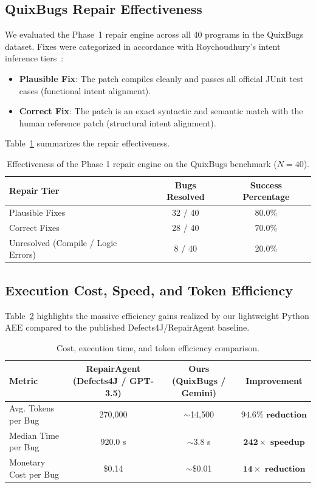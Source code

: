 \documentclass[12pt,a4paper]{report}
\begin{document}
\subsection{QuixBugs Repair Effectiveness}
We evaluated the Phase~1 repair engine across all 40 programs in the QuixBugs dataset. Fixes were categorized in accordance with Roychoudhury's intent inference tiers~\cite{roychoudhury2025agentic}:
\begin{itemize}
    \item \textbf{Plausible Fix}: The patch compiles cleanly and passes all official JUnit test cases (functional intent alignment).
    \item \textbf{Correct Fix}: The patch is an exact syntactic and semantic match with the human reference patch (structural intent alignment).
\end{itemize}

Table~\ref{tab:quixbugs_results} summarizes the repair effectiveness.

\begin{table}[htbp]
\centering
\caption{Effectiveness of the Phase 1 repair engine on the QuixBugs benchmark ($N = 40$).}
\label{tab:quixbugs_results}
\begin{tabular}{l c c}
\toprule
\textbf{Repair Tier} & \textbf{Bugs Resolved} & \textbf{Success Percentage} \\
\midrule
Plausible Fixes & 32 / 40 & 80.0\% \\
Correct Fixes & 28 / 40 & 70.0\% \\
Unresolved (Compile / Logic Errors) & 8 / 40 & 20.0\% \\
\bottomrule
\end{tabular}
\end{table}

\subsection{Execution Cost, Speed, and Token Efficiency}
Table~\ref{tab:cost_efficiency} highlights the massive efficiency gains realized by our lightweight Python AEE compared to the published Defects4J/RepairAgent baseline.

\begin{table}[htbp]
\centering
\caption{Cost, execution time, and token efficiency comparison.}
\label{tab:cost_efficiency}
\begin{tabular}{l c c c}
\toprule
\textbf{Metric} & \textbf{RepairAgent (Defects4J / GPT-3.5)} & \textbf{Ours (QuixBugs / Gemini)} & \textbf{Improvement} \\
\midrule
Avg. Tokens per Bug & 270,000 & $\sim$14,500 & $\mathbf{94.6\% \text{ reduction}}$ \\
Median Time per Bug & 920.0 s & $\sim$3.8 s & $\mathbf{242\times \text{ speedup}}$ \\
Monetary Cost per Bug & \$0.14 & $\sim$\$0.01 & $\mathbf{14\times \text{ reduction}}$ \\
\bottomrule
\end{tabular}
\end{table}
\end{document}
